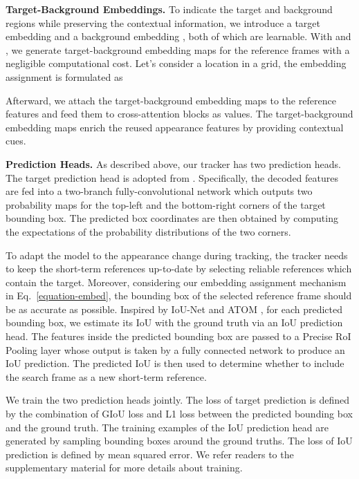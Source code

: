 \documentclass[runningheads]{llncs}
\begin{document}
\textbf{Target-Background Embeddings.} To indicate the target and background regions while preserving the contextual information, we introduce a target embedding  and a background embedding , both of which are learnable. With  and , we generate target-background embedding maps  for the reference frames with a negligible computational cost. Let's consider a location  in a  grid, the embedding assignment is formulated as


Afterward, we attach the target-background embedding maps to the reference features and feed them to cross-attention blocks as values. The target-background embedding maps enrich the reused appearance features by providing contextual cues.

\textbf{Prediction Heads.} As described above, our tracker has two prediction heads. The target prediction head is adopted from \cite{yan2021learning}. Specifically, the decoded features are fed into a two-branch fully-convolutional network which outputs two probability maps for the top-left and the bottom-right corners of the target bounding box. The predicted box coordinates are then obtained by computing the expectations of the probability distributions of the two corners.

To adapt the model to the appearance change during tracking, the tracker needs to keep the short-term references up-to-date by selecting reliable references which contain the target. Moreover, considering our embedding assignment mechanism in Eq.~\ref{equation-embed}, the bounding box of the selected reference frame should be as accurate as possible. Inspired by IoU-Net \cite{jiang2018acquisition} and ATOM \cite{danelljan2019atom}, for each predicted bounding box, we estimate its IoU with the ground truth via an IoU prediction head. The features inside the predicted bounding box are passed to a Precise RoI Pooling layer whose output is taken by a fully connected network to produce an IoU prediction. The predicted IoU is then used to determine whether to include the search frame as a new short-term reference.

We train the two prediction heads jointly. The loss of target prediction is defined by the combination of GIoU loss \cite{rezatofighi2019generalized} and L1 loss between the predicted bounding box and the ground truth. The training examples of the IoU prediction head are generated by sampling bounding boxes around the ground truths. The loss of IoU prediction is defined by mean squared error. We refer readers to the supplementary material for more details about training.
\end{document}
